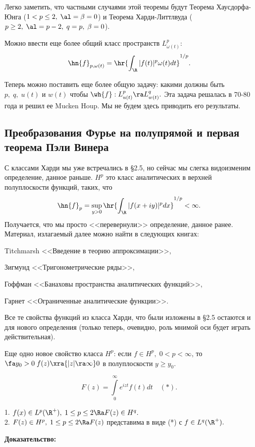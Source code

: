 \documentclass[a4paper]{article}
\begin{document}
\begin{wrapfigure}[10]{l}{220pt}
\end{wrapfigure}

Легко заметить, что частными случаями этой теоремы будут Теорема Хаусдорфа-Юнга ($1<p\le2,\;\al=\beta=0$)
и Теорема Харди-Литтлвуда ($p\ge2,\;\al=p-2,\;q=p,\;\beta=0$).

Можно ввести еще более общий класс пространств $L^p_{\omega(t)}$:
$$\hn{f}_{p,\omega(t)}=\hr{\int_{\R }|f(t)|^p\omega(t)dt}^{1/p}.$$

Теперь можно поставить еще более общую задачу: какими должны быть $p,\;q,\;u(t)$ и $w(t)$ чтобы
$\wh{f}:L^p_{u(t)}\ra L^q_{w(t)}.$ Эта задача решалась в 70-80 года и решил ее Mucken Houp. Мы
не будем здесь приводить его результаты.

\subsection{Преобразования Фурье на полупрямой и первая теорема Пэли Винера}
С классами Харди мы уже встречались в \S2.5, но сейчас мы слегка видоизменим определение, данное раньше.
$H^p$ это класс аналитических в верхней полуплоскости функций, таких, что
$$\hn{f}_p=\sup_{y>0}\hr{\int_{\R }|f(x+iy)|^pdx}^{1/p}<\infty. $$
Получается, что мы просто <<перевернули>> определение, данное ранее. Материал, излагаемый далее можно найти в
следующих книгах:

\medskip
Titchmarsh <<Введение в  теорию аппроксимации>>,

Зигмунд <<Тригонометрические ряды>>,

Гоффман <<Банаховы пространства аналитических функций>>,

Гарнет <<Ограниченные аналитические функции>>.

\medskip
Все те свойства функций из класса Харди, что были изложены в \S2.5 остаются и для нового определения (только
теперь, очевидно, роль мнимой оси будет играть действительная).

Еще одно новое свойство класса $H^p$: если $f\in H^p,\;0<p<\infty$, то $\fa
y_0>0\;f(z)\xra{|z|\ra\infty}0$ в полуплоскости $y\ge y_0.$

$$F(z)=\int\limits_0^{\infty}e^{izt}f(t)dt\quad (*).$$

\begin{theorems}\label{104}
1. $f(x)\in L^p(\R ^+),\;1\le p\le2\Ra F(z)\in H^q.$ \\\hangindent=2.3cm 2. $F(z)\in
H^p,\;1\le p\le2\Ra F(z)$ представима в виде (*) с $f\in L^q(\R ^+).$
\end{theorems}
\textbf{Доказательство:}
\end{document}
